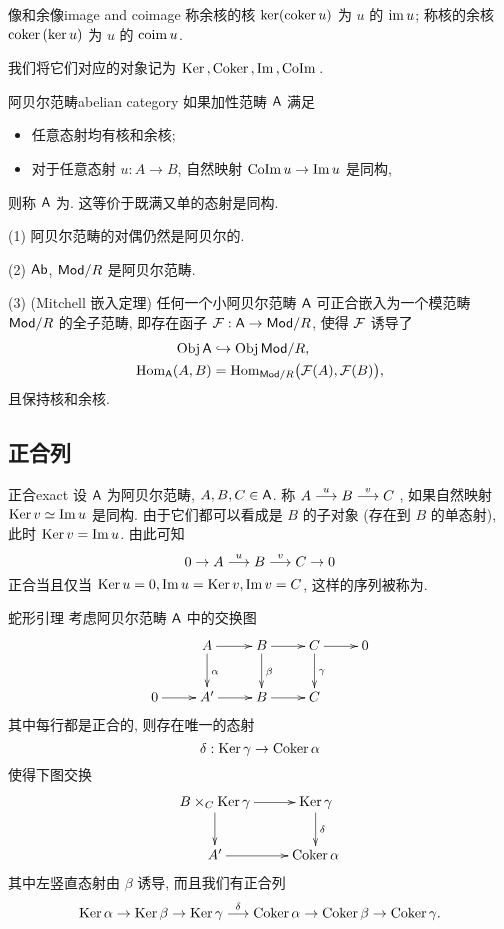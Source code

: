 \begin{definition}{像和余像}{image and coimage}
称余核的核 $\ker({\mathrm{coker}\,} u)$ 为 $u$ 的 ${\mathrm{im}\,} u$;
称核的余核 ${\mathrm{coker}\,}(\ker u)$ 为 $u$ 的 ${\mathrm{coim}\,} u$.
\end{definition}

我们将它们对应的对象记为 ${\mathrm{Ker}\,},{\mathrm{Coker}\,},{\mathrm{Im}\,},{\mathrm{CoIm}\,}$.

\begin{definition}{阿贝尔范畴}{abelian category}
如果加性范畴 ${\mathsf{A}}$ 满足
\begin{itemize}
\item 任意态射均有核和余核;
\item 对于任意态射 $u:A\to B$, 自然映射 ${\mathrm{CoIm}\,} u\to {\mathrm{Im}\,} u$ 是同构,
\end{itemize}
则称 ${\mathsf{A}}$ 为. 这等价于既满又单的态射是同构.
\end{definition}

\begin{example}
(1) 阿贝尔范畴的对偶仍然是阿贝尔的.

(2) ${\mathsf{Ab}}$, ${\mathsf{Mod}}/R$ 是阿贝尔范畴.

(3) (Mitchell 嵌入定理) 任何一个小阿贝尔范畴 ${\mathsf{A}}$ 可正合嵌入为一个模范畴 ${\mathsf{Mod}}/R$ 的全子范畴, 即存在函子 ${\mathcal{F}}:{\mathsf{A}}\to {\mathsf{Mod}}/R$, 使得 ${\mathcal{F}}$ 诱导了
\begin{align*}
{\mathrm{Obj}\,} {\mathsf{A}}&\hookrightarrow {\mathrm{Obj}\,}{\mathsf{Mod}}/R,\\
{\mathrm{Hom}}_{\mathsf{A}}(A,B)&={\mathrm{Hom}}_{{\mathsf{Mod}}/R}\bigl({\mathcal{F}}(A),{\mathcal{F}}(B)\bigr),
\end{align*}
且保持核和余核.
\end{example}

\subsection{正合列}\label{subsec:exact_sequence}

\begin{definition}{正合}{exact}
设 ${\mathsf{A}}$ 为阿贝尔范畴, $A,B,C\in {\mathsf{A}}$. 称 $A\stackrel{u}{\longrightarrow} B\stackrel{v}{\longrightarrow} C$ , 如果自然映射 ${\mathrm{Ker}\,} v\simeq {\mathrm{Im}\,} u$ 是同构. 由于它们都可以看成是 $B$ 的子对象 (存在到 $B$ 的单态射), 此时 ${\mathrm{Ker}\,} v={\mathrm{Im}\,} u$.
由此可知
  \[0\rightarrow A \stackrel{u}{\longrightarrow}B\stackrel{v}{\longrightarrow}C\rightarrow 0\]
正合当且仅当 ${\mathrm{Ker}\,} u=0, {\mathrm{Im}\,} u={\mathrm{Ker}\,} v,{\mathrm{Im}\,} v=C$, 这样的序列被称为.
\end{definition}

\begin{proposition}{蛇形引理}{}
考虑阿贝尔范畴 ${\mathsf{A}}$ 中的交换图
  \[\xymatrix{
    &A\ar[r]\ar[d]^{\alpha}&B\ar[r]\ar[d]^\beta&C\ar[r]\ar[d]^\gamma&0\\
    0\ar[r]&A'\ar[r]&B\ar[r]&C
  }\]
其中每行都是正合的, 则存在唯一的态射
  \[\delta:{\mathrm{Ker}\,} \gamma\to {\mathrm{Coker}\,}\alpha\]
使得下图交换
  \[\xymatrix{
    B\times_C\Ker\gamma\ar[r]\ar[d]&\Ker \gamma\ar[d]^\delta\\
    A'\ar[r]&\Coker \alpha
  }\]
其中左竖直态射由 $\beta$ 诱导, 而且我们有正合列
  \[{\mathrm{Ker}\,}\alpha\to{\mathrm{Ker}\,}\beta\to{\mathrm{Ker}\,}\gamma\stackrel{\delta}{\longrightarrow}{\mathrm{Coker}\,}\alpha\to{\mathrm{Coker}\,}\beta\to{\mathrm{Coker}\,}\gamma.\]
\end{proposition}

